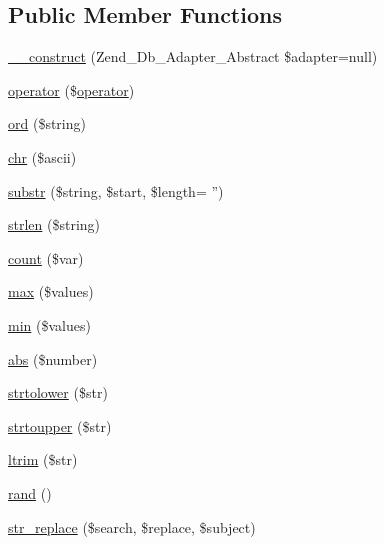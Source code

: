 \subsection*{\-Public \-Member \-Functions}
\begin{DoxyCompactItemize}
\item 
\hyperlink{class_p_h_p_linq___adapter___mysqli_a7cdb7dff8375c9933c7eb31f1ba39c62}{\-\_\-\-\_\-construct} (\-Zend\-\_\-\-Db\-\_\-\-Adapter\-\_\-\-Abstract \$adapter=null)
\item 
\hyperlink{class_p_h_p_linq___adapter___mysqli_a2d46ad013d8192e12a2fdd06f3e54bef}{operator} (\$\hyperlink{class_p_h_p_linq___adapter___mysqli_a2d46ad013d8192e12a2fdd06f3e54bef}{operator})
\item 
\hyperlink{class_p_h_p_linq___adapter___mysqli_ab127dddbdf514ba1c1a58f8b631f83bf}{ord} (\$string)
\item 
\hyperlink{class_p_h_p_linq___adapter___mysqli_a0c6e06290e94e1a67936ef4902323c5e}{chr} (\$ascii)
\item 
\hyperlink{class_p_h_p_linq___adapter___mysqli_ae2fa1e5fee5b3980c5050cabf74fcda4}{substr} (\$string, \$start, \$length= '')
\item 
\hyperlink{class_p_h_p_linq___adapter___mysqli_aa280f76645efe62221dc1348ebbbbd26}{strlen} (\$string)
\item 
\hyperlink{class_p_h_p_linq___adapter___mysqli_a2900b430a45434d72929e5e2fba9fe59}{count} (\$var)
\item 
\hyperlink{class_p_h_p_linq___adapter___mysqli_ae9a63c39a9e7d74f968ede7fa61038fe}{max} (\$values)
\item 
\hyperlink{class_p_h_p_linq___adapter___mysqli_a5c157a25cc2ce0a8ca5f36e55ef5cae4}{min} (\$values)
\item 
\hyperlink{class_p_h_p_linq___adapter___mysqli_a4a456efd0cb4726f5b770d2f859ae573}{abs} (\$number)
\item 
\hyperlink{class_p_h_p_linq___adapter___mysqli_a1b110623289b85debb6efaaff2bf722f}{strtolower} (\$str)
\item 
\hyperlink{class_p_h_p_linq___adapter___mysqli_ac2db10a13d66809bc5c9bd26428cd833}{strtoupper} (\$str)
\item 
\hyperlink{class_p_h_p_linq___adapter___mysqli_a36a0151237d3480734de64933f769843}{ltrim} (\$str)
\item 
\hyperlink{class_p_h_p_linq___adapter___mysqli_a02d3f138418af75a9152e5378a946c40}{rand} ()
\item 
\hyperlink{class_p_h_p_linq___adapter___mysqli_acf873c5fe629bc33732a0a2bc304f0f8}{str\-\_\-replace} (\$search, \$replace, \$subject)

\end{DoxyCompactItemize}
